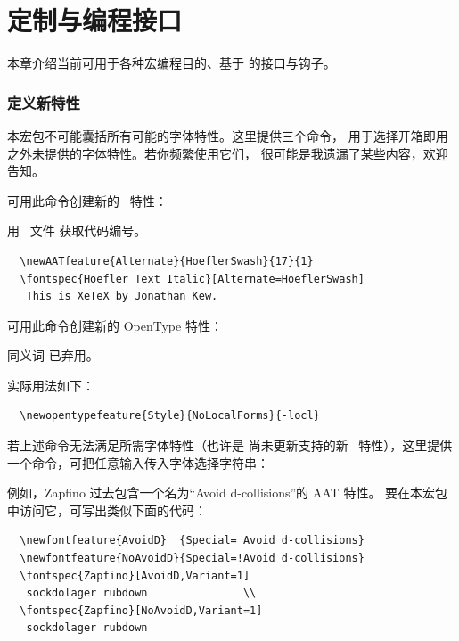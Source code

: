 \documentclass[a4paper]{l3doc}
\begin{document}
\part{定制与编程接口}

本章介绍当前可用于各种宏编程目的、基于  的接口与钩子。


\section{定义新特性} \label{sec:newfeatures}
本宏包不可能囊括所有可能的字体特性。这里提供三个命令，
用于选择开箱即用之外未提供的字体特性。若你频繁使用它们，
很可能是我遗漏了某些内容，欢迎告知。

\DescribeMacro{\newAATfeature}
可用此命令创建新的 \AAT\ 特性：\par
{\centering\cmd\newAATfeature{}\par}\noindent
用 \XeTeX\ 文件  获取代码编号。
\begin{Verbatim}
  \newAATfeature{Alternate}{HoeflerSwash}{17}{1}
  \fontspec{Hoefler Text Italic}[Alternate=HoeflerSwash]
   This is XeTeX by Jonathan Kew.
\end{Verbatim}


\DescribeMacro{\newopentypefeature}
可用此命令创建新的 OpenType 特性：\par
{\centering\cmd\newopentypefeature{}\par}
同义词  已弃用。

实际用法如下：
\begin{Verbatim}
  \newopentypefeature{Style}{NoLocalForms}{-locl}
\end{Verbatim}

\DescribeMacro{\newfontfeature}
若上述命令无法满足所需字体特性（也许是  尚未更新支持的新
\XeTeX\ 特性），这里提供一个命令，可把任意输入传入字体选择字符串：\par
{\centering\cmd{\newfontfeature}\par}

例如，Zapfino 过去包含一个名为“Avoid d-collisions”的 AAT 特性。
要在本宏包中访问它，可写出类似下面的代码：

\begin{Verbatim}
  \newfontfeature{AvoidD}  {Special= Avoid d-collisions}
  \newfontfeature{NoAvoidD}{Special=!Avoid d-collisions}
  \fontspec{Zapfino}[AvoidD,Variant=1]
   sockdolager rubdown               \\
  \fontspec{Zapfino}[NoAvoidD,Variant=1]
   sockdolager rubdown
\end{Verbatim}
\end{document}
